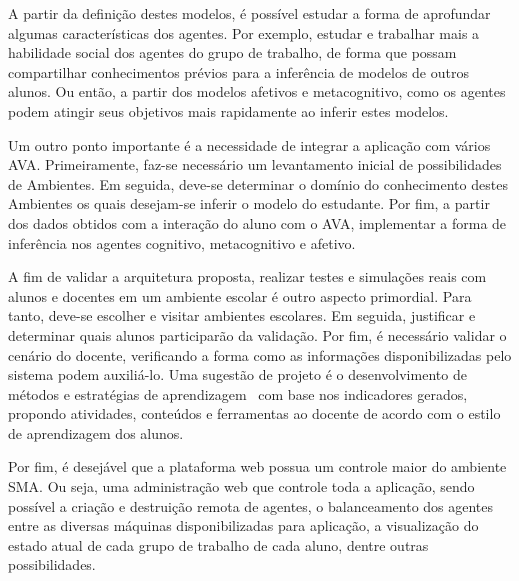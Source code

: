 A partir da definição destes modelos, é possível estudar a forma de aprofundar algumas características dos agentes. Por exemplo, estudar e trabalhar mais a habilidade social dos agentes do grupo de trabalho, de forma que possam compartilhar conhecimentos prévios para a inferência de modelos de outros alunos. Ou então, a partir dos modelos afetivos e metacognitivo, como os agentes podem atingir seus objetivos mais rapidamente ao inferir estes modelos.

Um outro ponto importante é a necessidade de integrar a aplicação com vários AVA. Primeiramente, faz-se necessário um levantamento inicial de possibilidades de Ambientes. Em seguida, deve-se determinar o domínio do conhecimento destes Ambientes os quais desejam-se inferir o modelo do estudante. Por fim, a partir dos dados obtidos com a interação do aluno com o AVA, implementar a forma de inferência nos agentes cognitivo, metacognitivo e afetivo.

A fim de validar a arquitetura proposta, realizar testes e simulações reais com alunos e docentes em um ambiente escolar é outro aspecto primordial. Para tanto, deve-se escolher e visitar ambientes escolares. Em seguida, justificar e determinar quais alunos participarão da validação. Por fim, é necessário validar o cenário do docente, verificando a forma como as informações disponibilizadas pelo sistema podem auxiliá-lo. Uma sugestão de projeto é o desenvolvimento de métodos e estratégias de aprendizagem~\cite{muhlbeier12} com base nos indicadores gerados, propondo atividades, conteúdos e ferramentas ao docente de acordo com o estilo de aprendizagem dos alunos.

Por fim, é desejável que a plataforma web possua um controle maior do ambiente SMA. Ou seja, uma administração web que controle toda a aplicação, sendo possível a criação e destruição remota de agentes, o balanceamento dos agentes entre as diversas máquinas disponibilizadas para aplicação, a visualização do estado atual de cada grupo de trabalho de cada aluno, dentre outras possibilidades.
